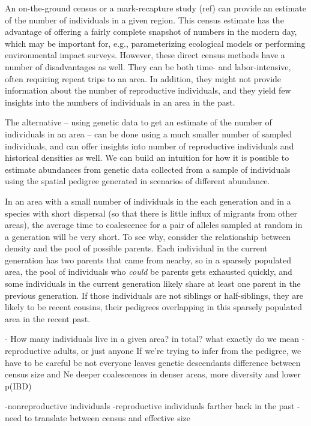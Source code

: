 \documentclass{ar-1col}
\begin{document}
An on-the-ground census or a mark-recapture study (ref)
can provide an estimate of the number of individuals in a given region.
This census estimate has the advantage of offering a fairly complete
snapshot of numbers in the modern day,
which may be important for, e.g.,
parameterizing ecological models
or performing environmental impact surveys.
However, these direct census methods have a number of disadvantages as well.
They can be both time- and labor-intensive,
often requiring repeat trips to an area.
In addition, they might not provide information
about the number of reproductive individuals,
and they yield few insights into the numbers of individuals
in an area in the past.

The alternative --
using genetic data to get an estimate of the number of individuals in an area --
can be done using a much smaller number of sampled individuals,
and can offer insights into number of reproductive individuals and historical densities as well.
We can build an intuition for how it is possible to estimate
abundances from genetic data collected from a sample of individuals
using the spatial pedigree generated in scenarios of different abundance.

In an area with a small number of individuals in the each generation
and in a species with short dispersal
(so that there is little influx of migrants from other areas),
the average time to coalescence for a pair of alleles sampled
at random in a generation will be very short.
To see why, consider the relationship between density
and the pool of possible parents.
Each individual in the current generation has two parents that came from nearby,
so in a sparsely populated area,
the pool of individuals who \emph{could} be parents gets exhausted quickly,
and some individuals in the current generation
likely share at least one parent in the previous generation.
If those individuals are not siblings or half-siblings,
they are likely to be recent cousins,
their pedigrees overlapping in this sparsely populated area
in the recent past.


        - How many individuals live in a given area? in total?
what exactly do we mean - reproductive adults, or just anyone
If we're trying to infer from the pedigree, we have to be careful bc not everyone leaves genetic descendants
difference between census size and Ne
deeper coalescences in denser areas, more diversity and lower p(IBD)

    -nonreproductive individuals
        -reproductive individuals farther back in the past
    -need to translate between census and effective size
\end{document}
